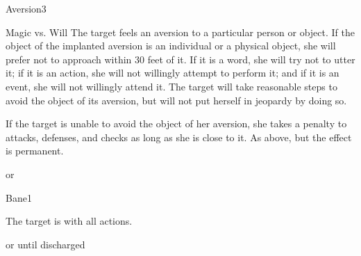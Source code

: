 \begin{spellsection}{Aversion}{3}
    \begin{spellheader}
    \end{spellheader}
    \begin{spellcontent}
        \begin{spelltargetinginfo}
        \end{spelltargetinginfo}
        \begin{spelleffects}
            \begin{spellattack}{Magic vs. Will}
                \spellsuccess The target feels an aversion to a particular person or object. If the object of the implanted aversion is an individual or a physical object, she will prefer not to approach within 30 feet of it. If it is a word, she will try not to utter it; if it is an action, she will not willingly attempt to perform it; and if it is an event, she will not willingly attend it. The target will take reasonable steps to avoid the object of its aversion, but will not put herself in jeopardy by doing so.
                \par If the target is unable to avoid the object of her aversion, she takes a  penalty to attacks, defenses, and checks as long as she is close to it.
                \spellcritical As above, but the effect is permanent.
            \end{spellattack}
            \spelldur \durshort or \durperm
        \end{spelleffects}
    \end{spellcontent}
    \begin{spellfooter}
        \miscastrandom
    \end{spellfooter}
\end{spellsection}


\begin{spellsection}{Bane}{1}
    \begin{spellheader}
    \end{spellheader}
    \begin{spellcontent}
        \begin{spelltargetinginfo}
        \end{spelltargetinginfo}
        \begin{spelleffects}
            \spelleffect The target is \impaired with all actions.

            \spelldur \durshort or until discharged \dismissable
        \end{spelleffects}
    \end{spellcontent}
    \begin{spellfooter}
        \miscastrandom
    \end{spellfooter}
\end{spellsection}

